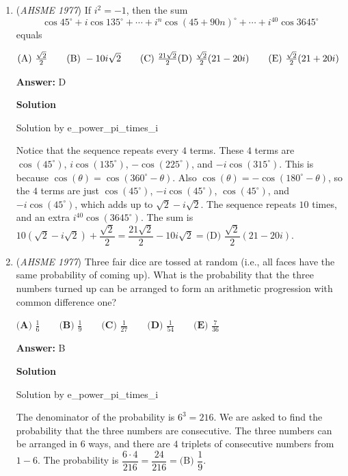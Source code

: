 \begin{enumerate}
	\item (\textit{AHSME 1977}) If $i^2 = -1$, then the sum 
 \[\cos{45^\circ} + i\cos{135^\circ} + \cdots + i^n\cos{(45 + 90n)^\circ}  + \cdots + i^{40}\cos{3645^\circ}\]
equals 


 $\text{(A)}\ \frac{\sqrt{2}}{2} \qquad  \text{(B)}\ -10i\sqrt{2} \qquad  \text{(C)}\ \frac{21\sqrt{2}}{2} \qquad\\ \text{(D)}\ \frac{\sqrt{2}}{2}(21 - 20i) \qquad  \text{(E)}\ \frac{\sqrt{2}}{2}(21 + 20i)$

 \textbf{Answer: }D



\textbf{Solution}

Solution by e\_power\_pi\_times\_i

 Notice that the sequence repeats every $4$ terms. These $4$ terms are $\cos(45^\circ)$, $i\cos(135^\circ)$, $-\cos(225^\circ)$, and $-i\cos(315^\circ)$. This is because $\cos(\theta) = \cos(360^\circ - \theta)$. Also $\cos(\theta) = -\cos(180^\circ - \theta)$, so the $4$ terms are just $\cos(45^\circ)$, $-i\cos(45^\circ)$, $\cos(45^\circ)$, and $-i\cos(45^\circ)$, which adds up to $\sqrt{2}-i\sqrt{2}$. The sequence repeats $10$ times, and an extra $i^{40}\cos(3645^\circ)$. The sum is $10(\sqrt{2}-i\sqrt{2})+\dfrac{\sqrt{2}}{2} = \dfrac{21\sqrt{2}}{2} - 10i\sqrt{2} = \boxed{\text{(D) }\dfrac{\sqrt{2}}{2}(21-20i)}$.

 


	\item (\textit{AHSME 1977}) Three fair dice are tossed at random (i.e., all faces have the same probability of coming up). 
What is the probability that the three numbers turned up can be arranged to form an arithmetic progression with common difference one?


 $\textbf{(A) }\frac{1}{6}\qquad \textbf{(B) }\frac{1}{9}\qquad \textbf{(C) }\frac{1}{27}\qquad \textbf{(D) }\frac{1}{54}\qquad \textbf{(E) }\frac{7}{36}$

 \textbf{Answer: }B



\textbf{Solution}

Solution by e\_power\_pi\_times\_i

 
The denominator of the probability is $6^3 = 216$. We are asked to find the probability that the three numbers are consecutive. The three numbers can be arranged in $6$ ways, and there are $4$ triplets of consecutive numbers from $1-6$. The probability is $\dfrac{6\cdot4}{216} = \dfrac{24}{216} = \boxed{\text{(B) }\dfrac{1}{9}}$.


\end{enumerate}
